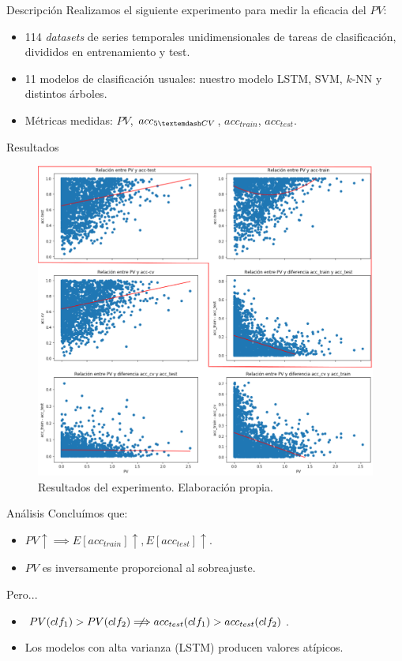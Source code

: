 \documentclass[spanish]{beamer}
\begin{document}
\begin{frame}{Descripción}
  Realizamos el siguiente experimento para medir la eficacia del $PV$:
  \begin{itemize}
    \item 114 \emph{datasets} de series temporales unidimensionales de tareas de clasificación, divididos en entrenamiento y test.
    \item 11 modelos de clasificación usuales: nuestro modelo LSTM, SVM, $k$-NN y distintos árboles.
    \item Métricas medidas: $PV$, $acc_{5\textemdash CV}$, $acc_{train}$, $acc_{test}$.
  \end{itemize}
\end{frame}

\begin{frame}{Resultados}
  \begin{figure}
    \centering
    \includegraphics[width=.74\textwidth]{img/res-pv}
    \caption{Resultados del experimento. Elaboración propia.}
  \end{figure}
\end{frame}

\begin{frame}{Análisis}
  Concluímos que:
  \begin{itemize}
    \item $PV \uparrow \implies E[acc_{train}]\uparrow, E[acc_{test}] \uparrow$.
    \item $PV$ es inversamente proporcional al sobreajuste.
  \end{itemize}
  \pause

  Pero...
  \begin{itemize}
    \item $PV(clf_1) > PV(clf_2) \centernot\Longrightarrow acc_{test}(clf_1) > acc_{test}(clf_2)$.
    \item Los modelos con alta varianza (LSTM) producen valores atípicos.
  \end{itemize}

\end{frame}
\end{document}
